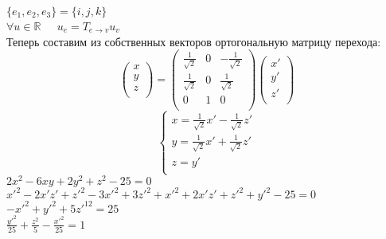 \documentclass{article}
\begin{document}
    $\{e_1, e_2, e_3\} = \{i, j, k\}$\\
    $\forall u \in \mathbb{R} \; \; \; \;$
    $u_e = T_{e \to v} u_v$ \\
    Теперь составим из собственных векторов ортогональную матрицу перехода:
    \begin{equation*}
        \begin{pmatrix}
            x\\
            y\\
            z\\
        \end{pmatrix}
        =
        \begin{pmatrix}
            \frac{1}{\sqrt{2}}& 0& - \frac{1}{\sqrt{2}}\\
            \frac{1}{\sqrt{2}}& 0& \frac{1}{\sqrt{2}}\\
            0& 1& 0\\
        \end{pmatrix}
        \begin{pmatrix}
            x'\\
            y'\\
            z'\\
        \end{pmatrix}
    \end{equation*}
    \begin{equation*}
        \begin{cases}
            x = \frac{1}{\sqrt{2}}x' - \frac{1}{\sqrt{2}}z'\\
            y = \frac{1}{\sqrt{2}}x' + \frac{1}{\sqrt{2}}z'\\
            z = y'\\
        \end{cases}
    \end{equation*}
    $2x^2 - 6xy +2 y^2 + z^2 - 25 =0$ \\
    $ x'^2 - 2x'z' + z'^2 - 3x'^2 + 3z'^2 + x'^2 + 2x'z'+z'^2 + y'^2 - 25 = 0$\\
    $-x'^2 + y'^2 + 5z'^12 = 25$ \\
    $\frac{y'^2}{25} + \frac{z^2}{5} - \frac{x'^2}{25} = 1$ \\
\end{document}
